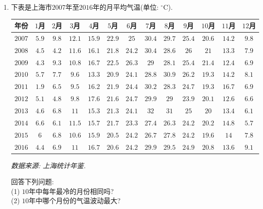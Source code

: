\documentclass[10pt,a4paper]{article}
\begin{document}
\begin{enumerate}[1.]
\item 下表是上海市$2007$年至$2016$年的月平均气温(单位: $^\circ\text{C}$).
\begin{center}
    \begin{tabular}{|c|c|c|c|c|c|c|c|c|c|c|c|c|}
        \hline
        年份 & $1$月 & $2$月 & $3$月 & $4$月 & $5$月 & $6$月 & $7$月 & $8$月 & $9$月 & $10$月 & $11$月 & $12$月 \\ \hline
        $2007$ & $5.9$ & $9.8$ & $12.1$ & $15.9$ & $22.9$ & $25$ & $30.4$ & $29.7$ & $25.4$ & $20.6$ & $14.2$ & $9.8$ \\ \hline
        $2008$ & $4.5$ & $4.2$ & $11.6$ & $16.1$ & $21.8$ & $24.2$ & $30.4$ & $28.6$ & $26$ & $21$ & $13.3$ & $7.9$ \\ \hline
        $2009$ & $4.3$ & $9.3$ & $10.8$ & $16.7$ & $22.5$ & $26.3$ & $29$ & $28.1$ & $25.4$ & $21.4$ & $12.4$ & $6.9$ \\ \hline
        $2010$ & $5.7$ & $7.7$ & $9.6$ & $13.3$ & $20.9$ & $24.1$ & $28.8$ & $30.9$ & $26.2$ & $19.3$ & $14.2$ & $8.1$\\ \hline
        $2011$ & $1.9$ & $6.5$ & $9.5$ & $16.2$ & $21.9$ & $24.4$ & $30.2$ & $28.3$ & $24.7$ & $19.3$ & $16.7$ & $6.9$\\ \hline
        $2012$ & $5.1$ & $4.8$ & $9.8$ & $17.6$ & $21.6$ & $24.7$ & $29.9$ & $29$ & $23.9$ & $20.1$ & $12.6$ & $6.6$\\ \hline
        $2013$ & $4.6$ & $6.8$ & $11$ & $15.3$ & $21.3$ & $24.1$ & $32$ &  $31$ & $25$ & $20$ & $13.4$ & $6.1$\\ \hline
        $2014$ & $6.6$ & $6.1$ & $11.5$ & $15.7$ & $21.7$ & $23.3$ & $27.4$ & $26.3$ & $24.2$ & $20.2$ & $14.8$ & $5.7$\\ \hline
        $2015$ & $6$ & $6.8$ & $10.6$ & $15.9$ & $20.5$ & $24.2$ & $26.7$ & $27.8$ & $24.2$ & $19.6$ & $14$ & $7.8$\\ \hline
        $2016$ & $4.4$ & $6.9$ & $11$ & $16.7$ & $20.6$ & $24.2$ & $29.9$ & $29.5$ & $24.9$ & $20.8$ & $13.6$ & $9.1$\\ \hline
    \end{tabular}
\end{center}
\begin{flushright}
{\it 数据来源: 上海统计年鉴.}
\end{flushright}
回答下列问题:\\
(1) $10$年中每年最冷的月份相同吗?\\
(2) $10$年中哪个月份的气温波动最大?\\

\end{enumerate}
\end{document}
